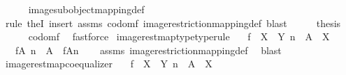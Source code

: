 \begin{isabellebody}
\ \ \ \ \isamarkupfalse%
\ image{\isacharunderscore}{\kern0pt}subobject{\isacharunderscore}{\kern0pt}mapping{\isacharunderscore}{\kern0pt}def\isanewline
\ \ \ \ \isamarkupfalse%
\ {\isacharparenleft}{\kern0pt}rule\ theI{\isacharprime}{\kern0pt}{\isacharcomma}{\kern0pt}\ insert\ assms\ codom{\isacharunderscore}{\kern0pt}f\ image{\isacharunderscore}{\kern0pt}restriction{\isacharunderscore}{\kern0pt}mapping{\isacharunderscore}{\kern0pt}def{}{\isacharcomma}{\kern0pt}\ blast{\isacharparenright}{\kern0pt}\isanewline
\ \ \isamarkupfalse%
\ \isamarkupfalse%
\ {\isacharquery}{\kern0pt}thesis\isanewline
\ \ \ \ \isamarkupfalse%
\ codom{\isacharunderscore}{\kern0pt}f\ \isamarkupfalse%
\ fastforce\isanewline
{}\isamarkupfalse%
%
\endisatagproof
{\isafoldproof}%
%
\isadelimproof
\isanewline
%
\endisadelimproof
\isanewline
{}\isamarkupfalse%
\ image{\isacharunderscore}{\kern0pt}rest{\isacharunderscore}{\kern0pt}map{\isacharunderscore}{\kern0pt}type{\isacharbrackleft}{\kern0pt}type{\isacharunderscore}{\kern0pt}rule{\isacharbrackright}{\kern0pt}{\isacharcolon}{\kern0pt}\isanewline
\ \ \ {\isachardoublequoteopen}f\ {\isacharcolon}{\kern0pt}\ X\ {\isasymrightarrow}\ Y{\isachardoublequoteclose}\ {\isachardoublequoteopen}n\ {\isacharcolon}{\kern0pt}\ A\ {\isasymrightarrow}\ X{\isachardoublequoteclose}\isanewline
\ \ \ {\isachardoublequoteopen}f{\isasymrestriction}\isactrlbsub {\isacharparenleft}{\kern0pt}A{\isacharcomma}{\kern0pt}\ n{\isacharparenright}{\kern0pt}\isactrlesub \ {\isacharcolon}{\kern0pt}\ A\ {\isasymrightarrow}\ f{\isasymlparr}A{\isasymrparr}\isactrlbsub n\isactrlesub {\isachardoublequoteclose}\isanewline
%
\isadelimproof
\ \ %
\endisadelimproof
%
\isatagproof
{}\isamarkupfalse%
\ assms\ image{\isacharunderscore}{\kern0pt}restriction{\isacharunderscore}{\kern0pt}mapping{\isacharunderscore}{\kern0pt}def{}\ \isamarkupfalse%
\ blast%
\endisatagproof
{\isafoldproof}%
%
\isadelimproof
\isanewline
%
\endisadelimproof
\isanewline
{}\isamarkupfalse%
\ image{\isacharunderscore}{\kern0pt}rest{\isacharunderscore}{\kern0pt}map{\isacharunderscore}{\kern0pt}coequalizer{\isacharcolon}{\kern0pt}\isanewline
\ \ \ {\isachardoublequoteopen}f\ {\isacharcolon}{\kern0pt}\ X\ {\isasymrightarrow}\ Y{\isachardoublequoteclose}\ {\isachardoublequoteopen}n\ {\isacharcolon}{\kern0pt}\ A\ {\isasymrightarrow}\ X{\isachardoublequoteclose}\isanewline

\end{isabellebody}
